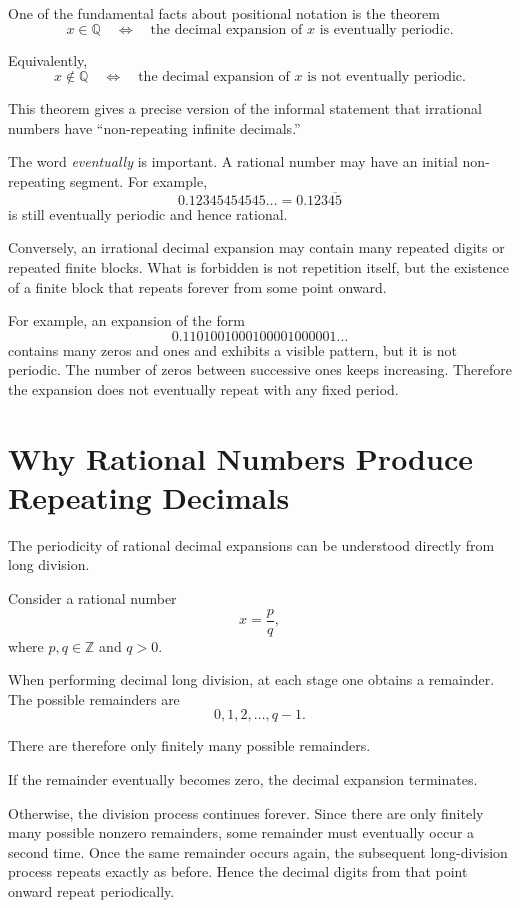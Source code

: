 \documentclass{essay}
\begin{document}
One of the fundamental facts about positional notation is the theorem
\[
x\in\mathbb{Q}
\quad\Longleftrightarrow\quad
\text{the decimal expansion of \(x\) is eventually periodic}.
\]

Equivalently,
\[
x\notin\mathbb{Q}
\quad\Longleftrightarrow\quad
\text{the decimal expansion of \(x\) is not eventually periodic}.
\]

This theorem gives a precise version of the informal statement that irrational numbers have ``non-repeating infinite decimals.''

The word \emph{eventually} is important. A rational number may have an initial non-repeating segment. For example,
\[
0.12345454545\ldots
=
0.123\overline{45}
\]
is still eventually periodic and hence rational.

Conversely, an irrational decimal expansion may contain many repeated digits or repeated finite blocks. What is forbidden is not repetition itself, but the existence of a finite block that repeats forever from some point onward.

For example, an expansion of the form
\[
0.1101001000100001000001\ldots
\]
contains many zeros and ones and exhibits a visible pattern, but it is not periodic. The number of zeros between successive ones keeps increasing. Therefore the expansion does not eventually repeat with any fixed period.

\section{Why Rational Numbers Produce Repeating Decimals}

The periodicity of rational decimal expansions can be understood directly from long division.

Consider a rational number
\[
x=\frac{p}{q},
\]
where \(p,q\in\mathbb{Z}\) and \(q>0\).

When performing decimal long division, at each stage one obtains a remainder. The possible remainders are
\[
0,1,2,\ldots,q-1.
\]

There are therefore only finitely many possible remainders.

If the remainder eventually becomes zero, the decimal expansion terminates.

Otherwise, the division process continues forever. Since there are only finitely many possible nonzero remainders, some remainder must eventually occur a second time. Once the same remainder occurs again, the subsequent long-division process repeats exactly as before. Hence the decimal digits from that point onward repeat periodically.
\end{document}
